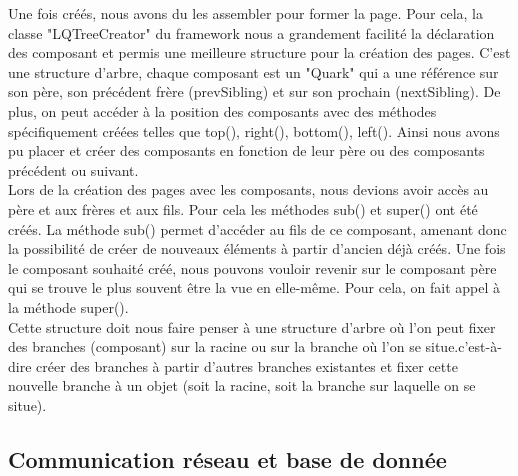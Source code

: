 \documentclass{report}
\begin{document}
Une fois créés, nous avons du les assembler pour former la page. Pour cela, la classe "LQTreeCreator" du framework nous a grandement facilité la déclaration des composant et permis une meilleure structure pour la création des pages. C'est une structure d'arbre, chaque composant est un "Quark" qui a une référence sur son père, son précédent frère (prevSibling) et sur son prochain (nextSibling). 
De plus, on peut accéder à la position des composants avec des méthodes spécifiquement créées telles que top(), right(), bottom(), left(). Ainsi nous avons pu placer et créer des composants en fonction de leur père ou des composants précédent ou suivant. \\
Lors de la création des pages avec les composants, nous devions avoir accès au père et aux frères et aux fils. Pour cela les méthodes sub() et super() ont été créés. La méthode sub() permet d'accéder au fils de ce composant, amenant donc la possibilité de créer de nouveaux éléments à partir d'ancien déjà créés.
Une fois le composant souhaité créé, nous pouvons vouloir revenir sur le composant père qui se trouve le plus souvent être la vue en elle-même. Pour cela, on fait appel à la méthode super().\\
Cette structure doit nous faire penser à une structure d'arbre où l'on peut fixer des branches (composant) sur la racine ou sur la branche où l'on se situe.c'est-à-dire créer des branches à partir d'autres branches existantes et fixer cette nouvelle branche à un objet (soit la racine, soit la branche sur laquelle on se situe). 

\subsection{Communication réseau et base de donnée}
\end{document}
